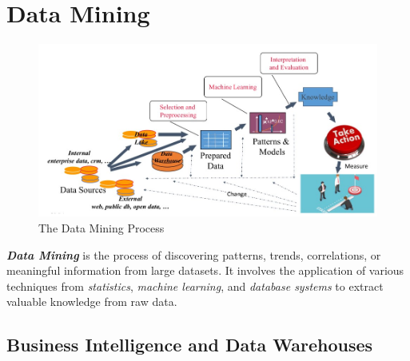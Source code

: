 \chapter{Data Mining}
\begin{figure}[ht!]
    \centering
    \includegraphics[scale=0.52]{images/Data_Mining_process.jpg}
    \caption{The Data Mining Process}
\end{figure}

\textbf{\textit{Data Mining}} is the process of discovering patterns, trends, correlations, or meaningful information from large datasets. It involves the application of various techniques from \textit{statistics}, \textit{machine learning}, and \textit{database systems} to extract valuable knowledge from raw data.

\section{Business Intelligence and Data Warehouses}

